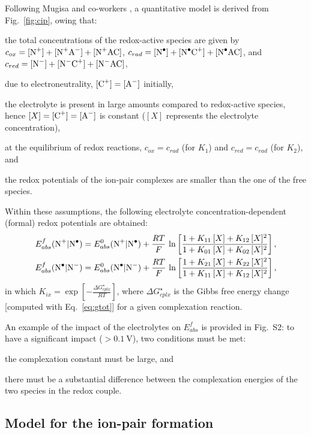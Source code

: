 \documentclass[review,preprint]{elsarticle}
\begin{document}
Following Mugisa and co-workers \cite{mugisaEffectIonparingKinetics2024}, a quantitative model is derived from Fig.~\ref{fig:cip}, owing that: \begin{inparaenum}[(i)]
	\item the total concentrations of the redox-active species are given by $c_{ox} = [\ce{N+}] + [\ce{N+A-}] + [\ce{N+AC}]$, $c_{rad} = [\ce{N^.}] + [\ce{N^.C+}] + [\ce{N^.AC}]$, and $c_{red} =  [\ce{N-}] + [\ce{N^-C+}] + [\ce{N^-AC}]$,
	\item due to electroneutrality, $ [\ce{C+}] = [\ce{A-}]$ initially,
	\item the electrolyte is present in large amounts compared to redox-active species, hence $[X] = [\ce{C+}] = [\ce{A-}] $ is constant ($[X]$ represents the electrolyte concentration),
	\item at the equilibrium of redox reactions, $c_{ox} = c_{rad}$ (for $K_1$) and $c_{red} = c_{rad}$ (for $K_2$), and
	\item the redox potentials of the ion-pair complexes are smaller than the one of the free species.
\end{inparaenum}
Within these assumptions, the following electrolyte concentration-dependent (formal) redox potentials are obtained:\begin{align}
	E^f_{abs}(\ce{N+|N^.}) &= E^0_ {abs}(\ce{N+|N^.})+\frac{RT}{F}\,\ln\left[\frac{1+K_{11}\,[X]+K_{12}\,[X]^2}{1+K_{01}\,[X]+K_{02}\,[X]^2}\right],\label{eq:ef1}\\
	E^f_{abs}(\ce{N^.|N-}) &= E^0_ {abs}(\ce{N^.|N-})+\frac{RT}{F}\,\ln\left[\frac{1+K_{21}\,[X]+K_{22}\,[X]^2}{1+K_{11}\,[X]+K_{12}\,[X]^2}\right],\label{eq:ef2}
\end{align}
in which $K_{ix}= \exp\left[-\frac{\Delta G_{cplx}^\star}{RT}\right]$, where $\Delta G_{cplx}^\star$ is the Gibbs free energy change [computed with Eq.~\eqref{eq:gtot}] for a given complexation reaction.

An example of the impact of the electrolytes on $E^f_{abs}$ is provided in Fig.~S2: to have a significant impact ($>\SI{0.1}{\volt}$), two conditions must be met: \begin{inparaenum}[(i)]
	\item the complexation constant must be large, and
	\item there must be a substantial difference between the complexation energies of the two species in the redox couple.
\end{inparaenum}

\subsection{Model for the ion-pair formation}
\end{document}
